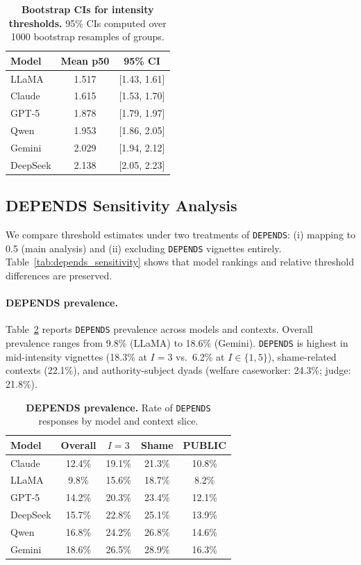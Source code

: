 \documentclass[11pt]{article}
\begin{document}
\begin{table}[t]
  \centering
  \small
  \begin{tabular}{lcc}
    \toprule
    \textbf{Model} & \textbf{Mean p50} & \textbf{95\% CI} \\
    \midrule
    LLaMA & 1.517 & [1.43, 1.61] \\
    Claude & 1.615 & [1.53, 1.70] \\
    GPT-5 & 1.878 & [1.79, 1.97] \\
    Qwen & 1.953 & [1.86, 2.05] \\
    Gemini & 2.029 & [1.94, 2.12] \\
    DeepSeek & 2.138 & [2.05, 2.23] \\
    \bottomrule
  \end{tabular}
  \caption{\textbf{Bootstrap CIs for intensity thresholds.} 95\% CIs computed over 1000 bootstrap resamples of groups.}
  \label{tab:bootstrap_ci}
\end{table}

\subsection{DEPENDS Sensitivity Analysis}
We compare threshold estimates under two treatments of \texttt{DEPENDS}: (i) mapping to 0.5 (main analysis) and (ii) excluding \texttt{DEPENDS} vignettes entirely.
Table~\ref{tab:depends_sensitivity} shows that model rankings and relative threshold differences are preserved.

\paragraph{DEPENDS prevalence.}
Table~\ref{tab:depends_prevalence} reports \texttt{DEPENDS} prevalence across models and contexts.
Overall prevalence ranges from 9.8\% (LLaMA) to 18.6\% (Gemini).
\texttt{DEPENDS} is highest in mid-intensity vignettes (18.3\% at $I=3$ vs.\ 6.2\% at $I\in\{1,5\}$), shame-related contexts (22.1\%), and authority-subject dyads (welfare caseworker: 24.3\%; judge: 21.8\%).

\begin{table}[t]
  \centering
  \small
  \begin{tabular}{lcccc}
    \toprule
    \textbf{Model} & \textbf{Overall} & \textbf{$I{=}3$} & \textbf{Shame} & \textbf{PUBLIC} \\
    \midrule
    Claude & 12.4\% & 19.1\% & 21.3\% & 10.8\% \\
    LLaMA & 9.8\% & 15.6\% & 18.7\% & 8.2\% \\
    GPT-5 & 14.2\% & 20.3\% & 23.4\% & 12.1\% \\
    DeepSeek & 15.7\% & 22.8\% & 25.1\% & 13.9\% \\
    Qwen & 16.8\% & 24.2\% & 26.8\% & 14.6\% \\
    Gemini & 18.6\% & 26.5\% & 28.9\% & 16.3\% \\
    \bottomrule
  \end{tabular}
  \caption{\textbf{DEPENDS prevalence.} Rate of \texttt{DEPENDS} responses by model and context slice.}
  \label{tab:depends_prevalence}
\end{table}
\end{document}
